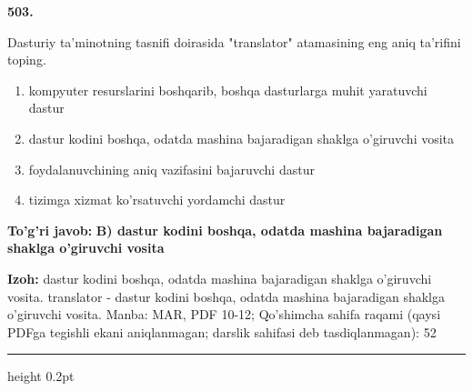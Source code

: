 \documentclass[10pt,a4paper]{article}
\begin{document}
{\bfseries\sffamily\color{ink} 503.}
\par
Dasturiy ta'minotning tasnifi doirasida "translator" atamasining eng aniq ta'rifini toping.
\begin{enumerate}[label=\Alph*),leftmargin=9mm]
\item kompyuter resurslarini boshqarib, boshqa dasturlarga muhit yaratuvchi dastur
\item dastur kodini boshqa, odatda mashina bajaradigan shaklga o'giruvchi vosita
\item foydalanuvchining aniq vazifasini bajaruvchi dastur
\item tizimga xizmat ko'rsatuvchi yordamchi dastur
\end{enumerate}
\begin{tcolorbox}[enhanced,breakable,colback=teal!4,colframe=teal!60!black,boxrule=0.45pt,arc=1.2mm,left=2.7mm,right=2.7mm,top=1.8mm,bottom=1.8mm,before skip=2mm,after skip=2mm]
{\bfseries\sffamily\color{teal}To'g'ri javob:} \textbf{B) dastur kodini boshqa, odatda mashina bajaradigan shaklga o'giruvchi vosita}
\par\smallskip
{\bfseries Izoh:} dastur kodini boshqa, odatda mashina bajaradigan shaklga o'giruvchi vosita. translator - dastur kodini boshqa, odatda mashina bajaradigan shaklga o'giruvchi vosita. Manba: MAR, PDF 10-12; Qo'shimcha sahifa raqami (qaysi PDFga tegishli ekani aniqlanmagan; darslik sahifasi deb tasdiqlanmagan): 52
\end{tcolorbox}
\vspace{2mm}\hrule height 0.2pt\vspace{3mm}
\end{document}
